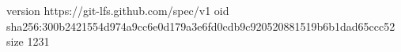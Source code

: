 version https://git-lfs.github.com/spec/v1
oid sha256:300b2421554d974a9cc6e0d179a3e6fd0cdb9c920520881519b6b1dad65ccc52
size 1231
